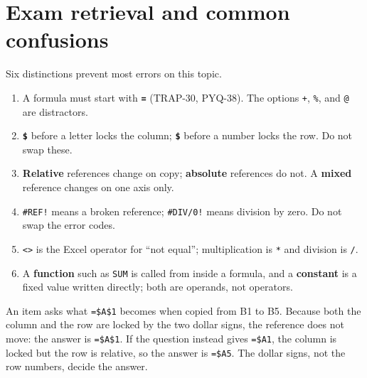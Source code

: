 \section{Exam retrieval and common confusions}
Six distinctions prevent most errors on this topic.
\begin{enumerate}
  \item A formula must start with \textbf{\texttt{=}} (TRAP-30, PYQ-38). The
    options \texttt{+}, \texttt{\%}, and \texttt{@} are distractors.
  \item \textbf{\texttt{\$}} before a letter locks the column; \textbf{\texttt{\$}}
    before a number locks the row. Do not swap these.
  \item \textbf{Relative} references change on copy; \textbf{absolute}
    references do not. A \textbf{mixed} reference changes on one axis only.
  \item \texttt{\#REF!} means a broken reference; \texttt{\#DIV/0!} means
    division by zero. Do not swap the error codes.
  \item \texttt{<>} is the Excel operator for ``not equal''; multiplication is
    \texttt{*} and division is \texttt{/}.
  \item A \textbf{function} such as \texttt{SUM} is called from inside a
    formula, and a \textbf{constant} is a fixed value written directly; both
    are operands, not operators.
\end{enumerate}

\begin{example}
An item asks what \texttt{=\$A\$1} becomes when copied from B1 to B5. Because
both the column and the row are locked by the two dollar signs, the reference
does not move: the answer is \texttt{=\$A\$1}. If the question instead gives
\texttt{=\$A1}, the column is locked but the row is relative, so the answer is
\texttt{=\$A5}. The dollar signs, not the row numbers, decide the answer.
\end{example}

